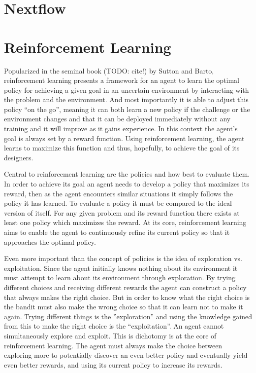 \section{Nextflow}
\label{sec:nextflow}

\section{Reinforcement Learning}
\label{sec:rl}

Popularized in the seminal book (TODO: cite!) by Sutton and Barto, reinforcement learning presents a framework for an agent to learn the optimal policy for achieving a given goal in an uncertain environment by interacting with the problem and the environment. And most importantly it is able to adjust this policy ``on the go'', meaning it can both learn a new policy if the challenge or the environment changes and that it can be deployed immediately without any training and it will improve as it gains experience. In this context the agent's goal is always set by a reward function. Using reinforcement learning, the agent learns to maximize this function and thus, hopefully, to achieve the goal of its designers. 

Central to reinforcement learning are the policies and how best to evaluate them. In order to achieve its goal an agent needs to develop a policy that maximizes its reward, then as the agent encounters similar situations it simply follows the policy it has learned. To evaluate a policy it must be compared to the ideal version of itself. For any given problem and its reward function there exists at least one policy which maximizes the reward. At its core, reinforcement learning aims to enable the agent to continuously refine its current policy so that it approaches the optimal policy. 

Even more important than the concept of policies is the idea of exploration vs. exploitation. Since the agent initially knows nothing about its environment it must attempt  to learn about its environment through exploration. By trying different choices and receiving different rewards the agent can construct a policy that always makes the right choice. But in order to know what the right choice is the bandit must also make the wrong choice so that it can learn not to make it again. Trying different things is the ''exploration'' and using the knowledge gained from this to make the right choice is the ``exploitation''. An agent cannot simultaneously explore and exploit. This is dichotomy is at the core of reinforcement learning. The agent must always make the choice between exploring more to potentially discover an even better policy and eventually yield even better rewards, and using its current policy to increase its rewards. 

